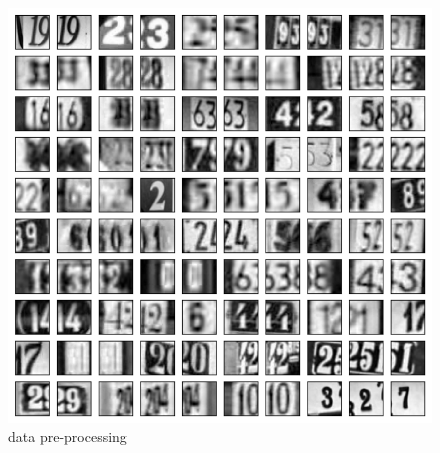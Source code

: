 \documentclass[twocolumn]{webofc}
\begin{document}
\begin{figure}[H]
  \centering
  \includegraphics[width=0.6\columnwidth]{gray.png}
  \caption{data pre-processing}
\end{figure}
\end{document}
